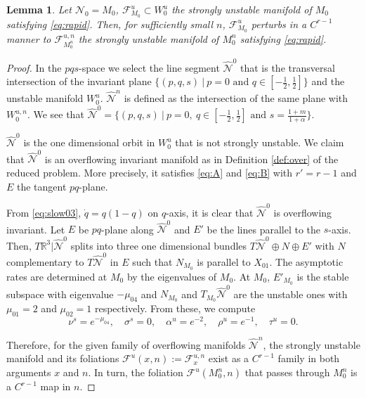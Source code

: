 \documentclass[11pt]{article}
\newcommand{\tcb}{}
\newtheorem{lemma}{Lemma}[section]
\theoremstyle{remark}
\begin{document}
\begin{lemma} \label{lem:rapid}
 Let $\mathcal{N}_0=M_0$, $\mathcal{F}^u_{M_0}\subset W_0^u$  the strongly unstable manifold of $M_0$ satisfying \eqref{eq:rapid}. Then, for sufficiently small $n$, $\mathcal{F}^u_{M_0}$ perturbs in a $C^{r-1}$ manner to $\mathcal{F}^{u,n}_{M_0^n}$ the strongly unstable manifold of $M_0^n$ satisfying \eqref{eq:rapid}.
\end{lemma}
\begin{proof}
\tcb {
In the $pqs$-space we select the line segment
$\hat{\mathcal{N}}^{0}$ that is the transversal intersection of the invariant plane $\Big\{(p,q,s)~|~ p=0 \text{ and }q\in [- \frac{1}{2}, \frac{1}{2}] \Big\}$ and the unstable manifold $W_0^u$. $\hat{\mathcal{N}}^{n}$ is defined as the intersection of the same plane with $W_0^{u,n}$. We see that $\hat{\mathcal{N}}^{0}=\Big\{(p,q,s)~|~ p=0, ~ q\in [- \frac{1}{2}, \frac{1}{2}] \text{ and } s= \frac{1+m}{1+\alpha}\Big\}.$
 }

  $\hat{\mathcal{N}}^{0}$ is the one dimensional orbit in $W_0^u$ that is not strongly unstable. We claim that $\hat{\mathcal{N}}^{0}$ is an overflowing invariant manifold as in Definition \ref{def:over} of the reduced problem. More precisely, it satisfies \eqref{eq:A} and \eqref{eq:B} with $r'=r-1$ and $E$ the tangent $pq$-plane.

 From \eqref{eq:slow03}, $\dot{q}=q(1-q)$ on $q$-axis, it is clear that $\hat{\mathcal{N}}^{0}$ is overflowing invariant. Let $E$ be $pq$-plane along $\hat{\mathcal{N}}^{0}$ and $E'$ be the lines parallel to the $s$-axis. Then, $T \mathbb{R}^3|\hat{\mathcal{N}}^{0}$ splits into three one dimensional bundles $T\hat{\mathcal{N}}^{0}\oplus N \oplus E'$ with $N$ complementary to $T\hat{\mathcal{N}}^{0}$ in $E$ such that $N_{M_0}$ is parallel to $X_{01}$.  %
 The asymptotic rates are determined at $M_0$ by the eigenvalues of $M_0$. At $M_0$, $E'_{M_0}$ is the stable subspace with eigenvalue $-\mu_{04}$ and $N_{M_0}$ and $T_{M_0}\hat{\mathcal{N}}^{0}$ are the unstable ones with $\mu_{01}=2$ and $\mu_{02}=1$ respectively. From these, we compute
 $$ \nu^s = e^{-\mu_{04}}, \quad\sigma^s = 0, \quad\alpha^u = e^{-2}, \quad\rho^u=e^{-1}, \quad\tau^u=0.$$

 Therefore, for the given family of overflowing manifolds $\hat{\mathcal{N}}^{n}$, the strongly unstable manifold and its foliations $\mathcal{F}^{u}(x,n):=\mathcal{F}^{u,n}_x$ exist as a $C^{r-1}$ family in both arguments $x$ and $n$. In turn, the foliation
 $\mathcal{F}^u(M_0^n,n)$ that passes through $M_0^n$ is a $C^{r-1}$ map in $n$.
\end{proof}
\end{document}
